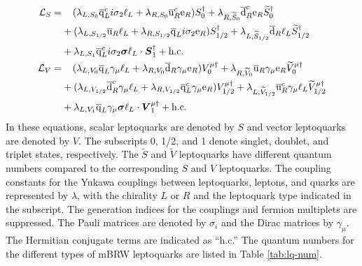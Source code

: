 \begin{align}
\label{eq:Lagrangian-SLQ}
\mathcal{L}_{S} = &\hphantom{+~}(\lambda_{L,S_{0}} \overline{\mathrm{q}}_{L}^{c} i\sigma_{2} \ell_{L} + \lambda_{R,S_{0}} \overline{\mathrm{u}}_{R}^{c} \mathrm{e}_{R})S_{0}^{\dagger}
+ \lambda_{R,\widetilde{S}_{0}} \overline{\mathrm{d}}_{R}^{c} \mathrm{e}_{R} \widetilde{S}_{0}^{\dagger} \nonumber \\
&+ (\lambda_{L,S_{1/2}} \overline{\mathrm{u}}_{R} \ell_{L} + \lambda_{R,S_{1/2}} \overline{\mathrm{q}}_{L} i\sigma_{2} \mathrm{e}_{R})S_{1/2}^{\dagger}
+ \lambda_{L,\widetilde{S}_{1/2}} \overline{\mathrm{d}}_{R} \ell_{L} \widetilde{S}_{1/2}^{\dagger} \nonumber \\
&+ \lambda_{L,S_{1}} \overline{\mathrm{q}}_{L}^{c} i\sigma_{2}\boldsymbol{\sigma} \ell_{L} \cdot \boldsymbol{S}_{1}^{\dagger} + \text{h.c.} \\
\label{eq:Lagrangian-VLQ}
\mathcal{L}_{V} = &\hphantom{+~}(\lambda_{L,V_{0}} \overline{\mathrm{q}}_{L} \gamma_{\mu} \ell_{L} + \lambda_{R,V_{0}} \overline{\mathrm{d}}_{R} \gamma_{\mu} \mathrm{e}_{R})V_{0}^{\mu\dagger}
+ \lambda_{R,\widetilde{V}_{0}} \overline{\mathrm{u}}_{R} \gamma_{\mu} \mathrm{e}_{R} \widetilde{V}_{0}^{\mu\dagger} \nonumber \\
&+ (\lambda_{L,V_{1/2}} \overline{\mathrm{d}}_{R}^{c} \gamma_{\mu} \ell_{L} + \lambda_{R,V_{1/2}} \overline{\mathrm{q}}_{L}^{c} \gamma_{\mu} \mathrm{e}_{R})V_{1/2}^{\mu\dagger}
+ \lambda_{L,\widetilde{V}_{1/2}} \overline{\mathrm{u}}_{R}^{c} \gamma_{\mu} \ell_{L} \widetilde{V}_{1/2}^{\mu\dagger} \nonumber \\
&+ \lambda_{L,V_{1}} \overline{\mathrm{q}}_{L} \gamma_{\mu}\boldsymbol{\sigma} \ell_{L} \cdot \boldsymbol{V}_{1}^{\mu\dagger} + \text{h.c.}
\end{align}
In these equations, scalar leptoquarks are denoted by $S$ and vector leptoquarks are denoted by $V$. The subscripts 0, 1/2, and 1 denote singlet, doublet, and triplet states, respectively. The $\widetilde{S}$ and $\widetilde{V}$ leptoquarks have different quantum numbers compared to the corresponding $S$ and $V$ leptoquarks. The coupling constants for the Yukawa couplings between leptoquarks, leptons, and quarks are represented by $\lambda$, with the chirality $L$ or $R$ and the leptoquark type indicated in the subscript. The generation indices for the couplings and fermion multiplets are suppressed. The Pauli matrices are denoted by $\sigma_{i}$ and the Dirac matrices by $\gamma_{\mu}$. The Hermitian conjugate terms are indicated as ``h.c.'' The quantum numbers for the different types of mBRW leptoquarks are listed in Table \ref{tab:lq-num}.

